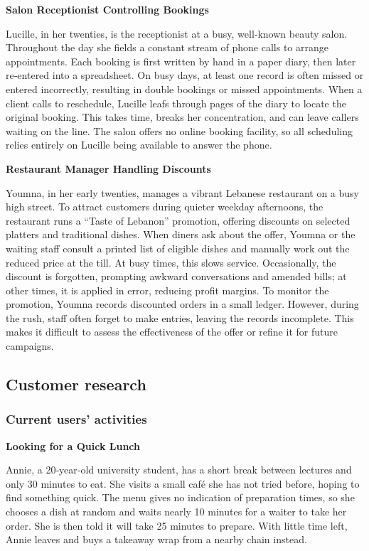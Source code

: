 \documentclass[]{VUMIFTemplateClass}
\newcommand{\subsubsubsection}[1]{\paragraph{#1}}
\begin{document}
\textbf{Salon Receptionist Controlling Bookings}

Lucille, in her twenties, is the receptionist at a busy, well‑known beauty salon. Throughout the day she fields a constant stream of phone calls to arrange appointments. Each booking is first written by hand in a paper diary, then later re‑entered into a spreadsheet. On busy days, at least one record is often missed or entered incorrectly, resulting in double bookings or missed appointments. When a client calls to reschedule, Lucille leafs through pages of the diary to locate the original booking. This takes time, breaks her concentration, and can leave callers waiting on the line. The salon offers no online booking facility, so all scheduling relies entirely on Lucille being available to answer the phone.

\textbf{Restaurant Manager Handling Discounts}

Youmna, in her early twenties, manages a vibrant Lebanese restaurant on a busy high street. To attract customers during quieter weekday afternoons, the restaurant runs a “Taste of Lebanon” promotion, offering discounts on selected platters and traditional dishes.
When diners ask about the offer, Youmna or the waiting staff consult a printed list of eligible dishes and manually work out the reduced price at the till. At busy times, this slows service. Occasionally, the discount is forgotten, prompting awkward conversations and amended bills; at other times, it is applied in error, reducing profit margins.
To monitor the promotion, Youmna records discounted orders in a small ledger. However, during the rush, staff often forget to make entries, leaving the records incomplete. This makes it difficult to assess the effectiveness of the offer or refine it for future campaigns.

\subsection{Customer research}

\subsubsection{Current users' activities}


\textbf{Looking for a Quick Lunch}

Annie, a 20‑year‑old university student, has a short break between lectures and only 30 minutes to eat. She visits a small café she has not tried before, hoping to find something quick. The menu gives no indication of preparation times, so she chooses a dish at random and waits nearly 10 minutes for a waiter to take her order. She is then told it will take 25 minutes to prepare. With little time left, Annie leaves and buys a takeaway wrap from a nearby chain instead.
\end{document}
